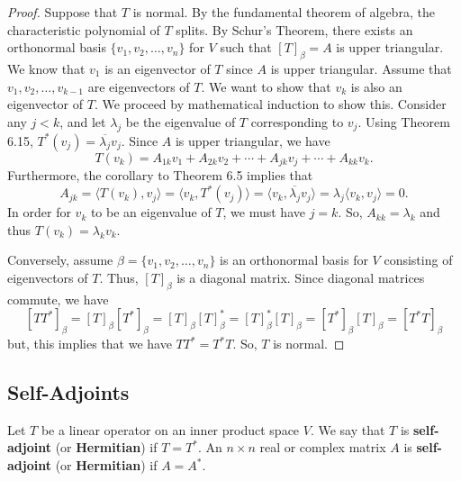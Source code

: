 \begin{proof}
Suppose that \( T  \) is normal. By the fundamental theorem of algebra, the characteristic  polynomial of \( T  \) splits. By Schur's Theorem, there exists an orthonormal basis \( \{ {v}_{1}, {v}_{2}, \dots, {v}_{n} \}   \) for \( V  \) such that \( [T]_{\beta} = A  \) is upper triangular. We know that \( {v}_{1}  \) is an eigenvector of \( T  \) since \( A  \) is upper triangular. Assume that \( {v}_{1}, {v}_{2}, \dots, {v}_{k-1} \) are eigenvectors of \( T  \). We want to show that \( {v}_{k} \) is also an eigenvector of \( T  \). We proceed by mathematical induction to show this. Consider any \( j < k  \), and let \( {\lambda}_{j} \) be the eigenvalue of \( T  \) corresponding to \( {v}_{j} \). Using Theorem 6.15,  \( T^{*}({v}_{j}) = \overline{{\lambda}_{j}} {v}_{j} \). Since \( A  \) is upper triangular, we have
\[ T({v}_{k}) = {A}_{1k} {v}_{1} + {A}_{2k} {v}_{2} + \cdots + {A}_{jk} {v}_{j} + \cdots + {A}_{kk} {v}_{k}.   \]
Furthermore, the corollary to Theorem 6.5 implies that
\[  {A}_{jk} = \langle T({v}_{k}) , {v}_{j} \rangle = \langle {v}_{k}  ,  T^{*}({v}_{j}) \rangle = \langle {v}_{k}  , \overline{{\lambda}_{j}} {v}_{j} \rangle = {\lambda}_{j} \langle {v}_{k} ,  {v}_{j} \rangle = 0. \]
In order for \( {v}_{k} \) to be an eigenvalue of \( T  \), we must have \( j = k  \). So, \( {A}_{kk} = {\lambda}_{k} \) and thus \( T({v}_{k}) = {\lambda}_{k } {v}_{k } \).

Conversely, assume \( \beta = \{ {v}_{1}, {v}_{2}, \dots, {v}_{n} \}  \) is an orthonormal basis for \( V  \) consisting of eigenvectors of \( T  \). Thus, \( [T]_{\beta} \) is a diagonal matrix. Since diagonal matrices commute, we have 
\[ [T T^{*}]_{\beta} =  [T]_{\beta} [T^{*}]_{\beta} = [T]_{\beta} [T]_{\beta}^{*}  = [T]_{\beta}^{*} [T]_{\beta} = [T^{*}]_{\beta} [T]_{\beta} = [T^{*}T ]_{\beta}  \]
but, this implies that we have \( T T^{*} = T^{*} T  \). So, \( T  \) is normal.
\end{proof} 

\subsection{Self-Adjoints}


\begin{definition}
Let \( T  \) be a linear operator on an inner product space \( V  \). We say that \( T  \) is \textbf{self-adjoint} (or \textbf{Hermitian}) if \( T = T^{*} \). An \( n \times n  \) real or complex matrix \( A  \) is \textbf{self-adjoint} (or \textbf{Hermitian}) if \( A = A^{*} \).   
\end{definition}

